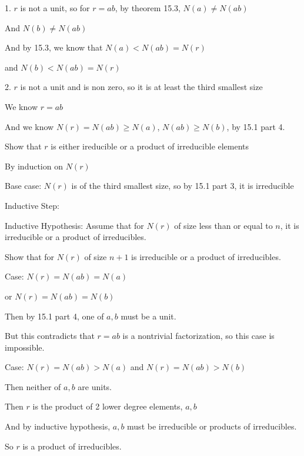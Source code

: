 \documentclass[12pt]{article}
\begin{document}
\begin{itemize}
	1. $r$ is not a unit, so for $r = ab$, by theorem 15.3, $N(a) \neq N(ab)$

	And $N(b) \neq N(ab)$

	And by 15.3, we know that $N(a) < N(ab) = N(r)$

	and $N(b) < N(ab) = N(r)$

	2. $r$ is not a unit and is non zero, so it is at least the third smallest size

	We know $r = ab$

	And we know $N(r) = N(ab) \geq N(a)$, $N(ab) \geq N(b)$, by 15.1 part 4.

	Show that $r$ is either ireducible or a product of irreducible elements

	By induction on $N(r)$

	Base case: $N(r)$ is of the third smallest size, so by 15.1 part 3, it is irreducible

	Inductive Step:

	Inductive Hypothesis: Assume that for $N(r)$ of size less than or equal to $n$, it is irreducible or a product of irreducibles.

	Show that for $N(r)$ of size $n+1$ is irreducible or a product of irreducibles.

	Case: $N(r) = N(ab) = N(a)$

	or $N(r) = N(ab) = N(b)$

	Then by 15.1 part 4, one of $a,b$ must be a unit.

	But this contradicts that $r = ab$ is a nontrivial factorization, so this case is impossible.

	Case: $N(r) = N(ab) > N(a)$ and $N(r) = N(ab) > N(b)$

	Then neither of $a,b$ are units. 

	Then $r$ is the product of 2 lower degree elements, $a,b$

	And by inductive hypothesis, $a,b$ must be irreducible or products of irreducibles.

	So $r$ is a product of irreducibles.

	\begin{comment}
	1. use part 4 of 15.1

	r = ab ( take norm both sides)

	2. Strong induction -> third smallest size starts induction

	3. Everything Norm < n is product of irreducibles

	N(r) = ab > na since a,b not a unit iff N(ab) > nb


\end{comment}
\end{itemize}
\end{document}
